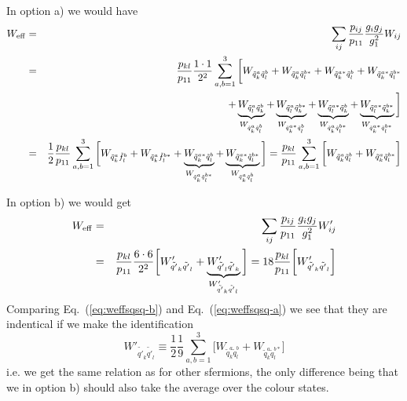 \documentclass[a4paper,10pt,oneside]{book}
\begin{document}
In option a) we would have 
\begin{eqnarray}
    W_{\rm eff} & = & \sum_{ij}\frac{p_{ij}}{p_{11}} 
    \frac{g_{i}g_{j}}{g_{1}^2} W_{ij}
    \nonumber \\
    & = & \frac{p_{kl}}{p_{11}} \frac{1 \cdot 1}{2^2}
    \sum_{a,b=1}^3 \bigg[ 
    W_{\tilde{q}_{k}^a \tilde{q}_{l}^b} +
    W_{\tilde{q}_{k}^a \tilde{q}_{l}^{b*}} +
    W_{\tilde{q}_{k}^{a*} \tilde{q}_{l}^b} +
    W_{\tilde{q}_{k}^{a*} \tilde{q}_{l}^{b*}} \nonumber \\
    & & +
    \underbrace{W_{\tilde{q}_{l}^a \tilde{q}_{k}^b}}_
       {W_{\tilde{q}_{k}^a \tilde{q}_{l}^b}} +
    \underbrace{W_{\tilde{q}_{l}^a \tilde{q}_{k}^{b*}}}_
       {W_{\tilde{q}_{k}^{a*} \tilde{q}_{l}^b}} +
    \underbrace{W_{\tilde{q}_{l}^{a*} \tilde{q}_{k}^b}}_
       {W_{\tilde{q}_{k}^a \tilde{q}_{l}^{b*}}} +
    \underbrace{W_{\tilde{q}_{l}^{a*} \tilde{q}_{k}^{b*}}}_
       {W_{\tilde{q}_{k}^{a*} \tilde{q}_{l}^{b*}}}
    \bigg]  \nonumber \\
    & = &
    \frac{1}{2} \frac{p_{kl}}{p_{11}}
    \sum_{a,b=1}^3 \bigg[ 
    W_{\tilde{q}_{k}^a \tilde{f}_{l}^b} +
    W_{\tilde{q}_{k}^a \tilde{f}_{l}^{b*}} +
    \underbrace{W_{\tilde{q}_{k}^{a*} \tilde{q}_{l}^b}}_
        {W_{\tilde{q}_{k}^a \tilde{q}_{l}^{b*}}} +
    \underbrace{W_{\tilde{q}_{k}^{a*} \tilde{q}_{l}^{b*}}}_
        {W_{\tilde{q}_{k}^a \tilde{q}_{l}^b}}
    \bigg] 
    = \frac{p_{kl}}{p_{11}}
    \sum_{a,b=1}^3 \bigg[ 
    W_{\tilde{q}_{k}^a \tilde{q}_{l}^b} +
    W_{\tilde{q}_{k}^a \tilde{q}_{l}^{b*}}
    \bigg] \label{eq:weffsqsq-a}
\end{eqnarray}    

In option b) we would get 
\begin{eqnarray}
    W_{\rm eff} & = & \sum_{ij}\frac{p_{ij}}{p_{11}} 
    \frac{g_{i}g_{j}}{g_{1}^2} W'_{ij}
    \nonumber \\
    & = & \frac{p_{kl}}{p_{11}} \frac{6 \cdot 6}{2^2}
    \bigg[ 
    W'_{\tilde{q'}_{k} \tilde{q'}_{l}} +
    \underbrace{W'_{\tilde{q'}_{l} \tilde{q'}_{k}}}_
       {W'_{\tilde{q'}_{k} \tilde{q'}_{l}}} \bigg]
    = 18 \frac{p_{kl}}{p_{11}} \bigg[
    W'_{\tilde{q'}_{k} \tilde{q'}_{l}}\bigg]
    \label{eq:weffsqsq-b}
\end{eqnarray}
Comparing Eq.~(\ref{eq:weffsqsq-b}) and Eq.~(\ref{eq:weffsqsq-a}) we 
see that they are indentical if we make the identification
\begin{equation}
    W'_{\tilde{q'}_{k} \tilde{q'}_{l}} \equiv 
    \frac{1}{2} \frac{1}{9}\sum_{a,b=1}^3 \bigg[
    W_{\tilde{q}_{k}^a \tilde{q}_{l}^b} + 
    W_{\tilde{q}_{k}^a \tilde{q}_{l}^{b*}} \bigg] 
\end{equation}
i.e. we get the same relation as for other sfermions, the only difference being that
we in option b) should also take the average over the colour states. 
\end{document}
